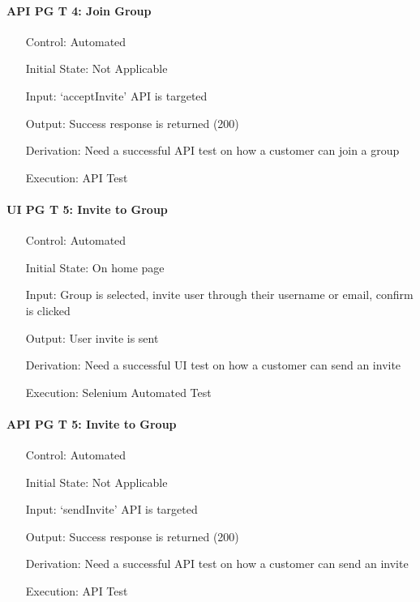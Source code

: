 \documentclass[12pt, titlepage]{article}
\begin{document}
\paragraph*{API PG T 4: Join Group}
\begin{itemize}
	\item[Control:] Automated
	\item[Initial State:] Not Applicable
	\item[Input:] `acceptInvite' API is targeted
	\item[Output:] Success response is returned (200)
	\item[Derivation:] Need a successful API test on how a customer can join a group
	\item[Execution:] API Test
\end{itemize}

\paragraph*{UI PG T 5: Invite to Group}
\begin{itemize}
	\item[Control:] Automated
	\item[Initial State:] On home page
	\item[Input:] Group is selected, invite user through their username or email, confirm is clicked
	\item[Output:] User invite is sent
	\item[Derivation:] Need a successful UI test on how a customer can send an invite
	\item[Execution:] Selenium Automated Test
\end{itemize}

\paragraph*{API PG T 5: Invite to Group}
\begin{itemize}
	\item[Control:] Automated
	\item[Initial State:] Not Applicable
	\item[Input:] `sendInvite' API is targeted
	\item[Output:] Success response is returned (200)
	\item[Derivation:] Need a successful API test on how a customer can send an invite
	\item[Execution:] API Test
\end{itemize}
\end{document}
